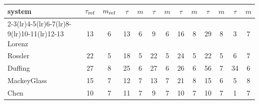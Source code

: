 \begin{tabular}{lcccccccccccc}
\toprule
system & $\tau_{\rm ref}$ & $m_{\rm ref}$ & $\tau$ & $m$ & $\tau$ & $m$ & $\tau$ & $m$ & $\tau$ & $m$ & $\tau$ & $m$ \\
\cmidrule(lr){2-3}\cmidrule(lr){4-5}\cmidrule(lr){6-7}\cmidrule(lr){8-9}\cmidrule(lr){10-11}\cmidrule(lr){12-13}
Lorenz & 13 & 6 & 13 & 6 & 9 & 6 & 16 & 8 & 29 & 8 & 3 & 7 \\
Rossler & 22 & 5 & 18 & 5 & 22 & 5 & 24 & 5 & 22 & 5 & 6 & 7 \\
Duffing & 27 & 8 & 25 & 6 & 27 & 6 & 26 & 6 & 56 & 7 & 34 & 6 \\
MackeyGlass & 15 & 7 & 12 & 7 & 13 & 7 & 21 & 8 & 15 & 6 & 5 & 8 \\
Chen & 10 & 7 & 11 & 7 & 9 & 7 & 10 & 7 & 10 & 7 & 1 & 7 \\
\bottomrule
\end{tabular}
